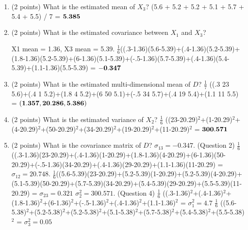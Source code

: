 \documentclass[11pt]{article}
\begin{document}
\begin{enumerate}
    \item (2 points) What is the estimated mean of $X_3$?
    \newline
    \newline (5.6 + 5.2 + 5.2 + 5.1 + 5.7 + 5.4 + 5.5) / 7 = $\bf{5.385}$
    \item (2 points) What is the estimated covariance between $X_1$ and $X_3$?
    \newline

    \newline X1 mean = 1.36, X3 mean = 5.39.
    \newline $\frac{1}{6}$((.3-1.36)(5.6-5.39)+(.4-1.36)(5.2-5.39)+(1.8-1.36)(5.2-5.39)+(6-1.36)(5.1-5.39)+(-.5-1.36)(5.7-5.39)+(.4-1.36)(5.4-5.39)+(1.1-1.36)(5.5-5.39) = $\bf{-0.347}$
    \item (2 points) What is the estimated multi-dimensional mean of $D$?
    \newline
    \newline $\frac{1}{7}$ ((.3 23 5.6)+(.4 1 5.2)+(1.8 4 5.2)+(6 50 5.1)+(-.5 34 5.7)+(.4 19 5.4)+(1.1 11 5.5) = $\bf{(1.357, 20.286, 5.386)}$
    \item (2 points) What is the estimated variance of $X_2$?
    \newline
    \newline $\frac{1}{6}$ ((23-20.29)$^2$+(1-20.29)$^2$+(4-20.29)$^2$+(50-20.29)$^2$+(34-20.29)$^2$+(19-20.29)$^2$+(11-20.29)$^2$ = $\bf{300.571}$
    \item (2 points) What is the covariance matrix of $D$?
    \newline $\sigma_{13} = -0.347$. (Question 2)
    \newline
    \newline$\frac{1}{6}$((.3-1.36)(23-20.29)+(.4-1.36)(1-20.29)+(1.8-1.36)(4-20.29)+(6-1.36)(50-20.29)+(-.5-1.36)(34-20.29)+(.4-1.36)(29-20.29)+(1.1-1.36)(11-20.29) = $\sigma_{12} = 20.748$.
    \newline
    \newline$\frac{1}{6}$((5.6-5.39)(23-20.29)+(5.2-5.39)(1-20.29)+(5.2-5.39)(4-20.29)+(5.1-5.39)(50-20.29)+(5.7-5.39)(34-20.29)+(5.4-5.39)(29-20.29)+(5.5-5.39)(11-20.29) = $\sigma_{23} = 0.321$
    \newline
    \newline $\sigma^2_2 = 300.571$. (Question 4)
    \newline
    \newline $\frac{1}{6}$ ((.3-1.36)$^2$+(.4-1.36)$^2$+(1.8-1.36)$^2$+(6-1.36)$^2$+(-.5-1.36)$^2$+(.4-1.36)$^2$+(1.1-1.36)$^2$ = $\sigma^2_1 = 4.7$
    \newline
    \newline $\frac{1}{6}$ ((5.6-5.38)$^2$+(5.2-5.38)$^2$+(5.2-5.38)$^2$+(5.1-5.38)$^2$+(5.7-5.38)$^2$+(5.4-5.38)$^2$+(5.5-5.38)$^2$ =
    \newline$\sigma^2_3 = 0.05$
    

\end{enumerate}
\end{document}
